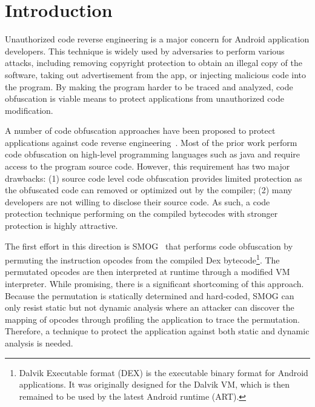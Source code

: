 \section{Introduction}

Unauthorized code reverse engineering is a major concern for Android
application developers. This technique is widely used by adversaries to
perform various attacks, including removing copyright protection to obtain an
illegal copy of the software, taking out advertisement from the app, or
injecting malicious code into the program. By making the program harder to be
traced and analyzed, code obfuscation is viable means to
protect applications from unauthorized code modification.


A number of code obfuscation approaches have been proposed to protect
applications against code reverse engineering~\cite{06,07,08,09}. Most of the
prior work perform code obfuscation on high-level programming languages such
as java and require access to the program source code. However, this
requirement has two major drawbacks: (1) source code level code obfuscation
provides limited protection as the obfuscated code can removed or
optimized out by the compiler; (2) many developers are not willing to disclose
their source code.  As such, a code
protection technique performing on the compiled bytecodes with stronger protection is highly attractive.


The first effort in this direction is SMOG~\cite{10} that performs code
obfuscation by permuting the instruction opcodes from the compiled Dex
bytecode\footnote{Dalvik Executable format (DEX) is the executable binary format for Android
applications. It was originally designed for the Dalvik VM, which is then
remained to be used by the latest Android runtime (ART).}. The permutated opcodes are then
interpreted at runtime through a modified VM interpreter. While promising,
there is a significant shortcoming of this approach. Because the permutation
is statically determined and hard-coded, SMOG can only resist static but not
dynamic analysis where an attacker can discover the mapping of opcodes through
profiling the application to trace the permutation. Therefore, a technique to
protect the application against both static and dynamic analysis is needed.


